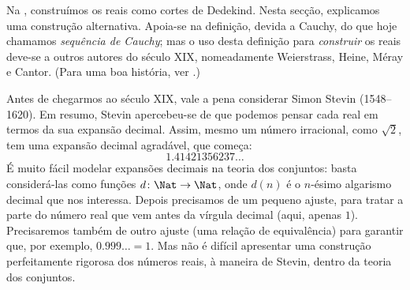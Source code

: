\documentclass[../../../include/open-logic-section]{subfiles}
\begin{document}


Na , construímos os reais como cortes de Dedekind. Nesta
secção, explicamos uma construção alternativa. Apoia-se na definição, devida a Cauchy,
do que hoje chamamos \emph{sequência de Cauchy}; mas o uso desta definição para
\emph{construir} os reais deve-se a outros autores do século XIX, nomeadamente
Weierstrass, Heine, M\'{e}ray e Cantor. (Para uma boa história, ver
\citeauthor{OConnorRobertson:RN}
\citeyear{OConnorRobertson:RN}.)

Antes de chegarmos ao século XIX, vale a pena considerar Simon Stevin
(1548--1620). Em resumo, Stevin apercebeu-se de que podemos pensar cada real em
termos da sua expansão decimal. Assim, mesmo um número irracional, como
$\sqrt{2}$, tem uma expansão decimal agradável, que começa:
\[
	1.41421356237\ldots
\] 
É muito fácil modelar expansões decimais na teoria dos conjuntos: basta
considerá-las como funções $d \colon \Nat \to \Nat$, onde $d(n)$ é o $n$-ésimo
algarismo decimal que nos interessa. Depois precisamos de um pequeno ajuste,
para tratar a parte do número real que vem antes da vírgula decimal (aqui,
apenas $1$). Precisaremos também de outro ajuste (uma relação de equivalência)
para garantir que, por exemplo, $0.999\ldots
= 1$. Mas não é difícil apresentar uma construção perfeitamente rigorosa dos
números reais, à maneira de Stevin, dentro da teoria dos conjuntos.
\end{document}
